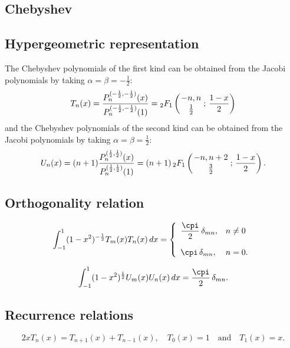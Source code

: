 \documentclass[envcountchap,graybox]{svmono}
\newcounter{rom}
\newcommand{\hyp}[5]{\mbox{}_{#1}{F}_{#2}
\left(\genfrac{}{}{0pt}{}{#3}{#4}\,;\,#5\right)}
\newcommand{\hyp}[5]{\,\mbox{}_{#1}F_{#2}\!\left(
  \genfrac{}{}{0pt}{}{#3}{#4};#5\right)}
\begin{document}
\subsection{Chebyshev}

\par

\subsection*{Hypergeometric representation}
The Chebyshev polynomials of the first kind can be obtained from the Jacobi
polynomials by taking $\alpha=\beta=-\frac{1}{2}$:
\begin{equation}
\label{DefChebyshevI}
T_n(x)=\frac{P_n^{(-\frac{1}{2},-\frac{1}{2})}(x)}{P_n^{(-\frac{1}{2},-\frac{1}{2})}(1)}
=\hyp{2}{1}{-n,n}{\frac{1}{2}}{\frac{1-x}{2}}
\end{equation}
and the Chebyshev polynomials of the second kind can be obtained from the
Jacobi polynomials by taking $\alpha=\beta=\frac{1}{2}$:
\begin{equation}
\label{DefChebyshevII}
U_n(x)=(n+1)\frac{P_n^{(\frac{1}{2},\frac{1}{2})}(x)}{P_n^{(\frac{1}{2},\frac{1}{2})}(1)}
=(n+1)\,\hyp{2}{1}{-n,n+2}{\frac{3}{2}}{\frac{1-x}{2}}.
\end{equation}

\subsection*{Orthogonality relation}
\begin{equation}
\label{OrtChebyshevI}
\int_{-1}^1(1-x^2)^{-\frac{1}{2}}T_m(x)T_n(x)\,dx=
\left\{\begin{array}{ll}
\displaystyle\frac{\cpi}{2}\,\delta_{mn}, & n\neq 0\\[5mm]
\cpi\,\delta_{mn}, & n=0.
\end{array}\right.
\end{equation}

\begin{equation}
\label{OrtChebyshevII}
\int_{-1}^1(1-x^2)^{\frac{1}{2}}U_m(x)U_n(x)\,dx=\frac{\cpi}{2}\,\delta_{mn}.
\end{equation}

\subsection*{Recurrence relations}
\begin{equation}
\label{RecChebyshevI}
2xT_n(x)=T_{n+1}(x)+T_{n-1}(x),\quad T_{0}(x)=1\quad\textrm{and}\quad T_1(x)=x.
\end{equation}
\end{document}
